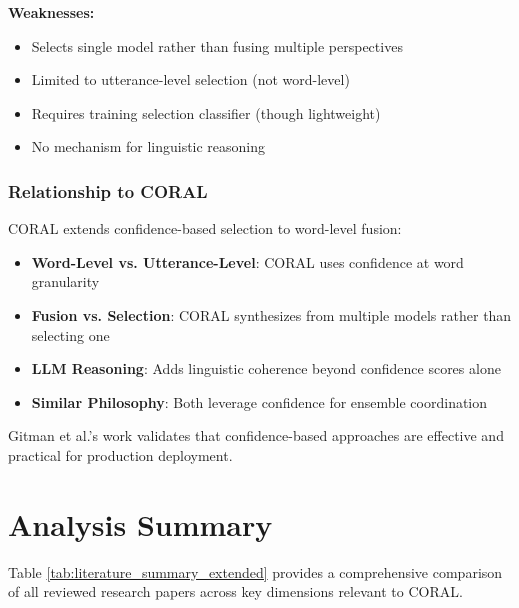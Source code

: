\textbf{Weaknesses:}
\begin{itemize}[topsep=4pt,itemsep=2pt]
    \item Selects single model rather than fusing multiple perspectives
    \item Limited to utterance-level selection (not word-level)
    \item Requires training selection classifier (though lightweight)
    \item No mechanism for linguistic reasoning
\end{itemize}

\subsubsection{Relationship to CORAL}

CORAL extends confidence-based selection to word-level fusion:

\begin{itemize}[topsep=4pt,itemsep=2pt]
    \item \textbf{Word-Level vs. Utterance-Level}: CORAL uses confidence at word granularity
    \item \textbf{Fusion vs. Selection}: CORAL synthesizes from multiple models rather than selecting one
    \item \textbf{LLM Reasoning}: Adds linguistic coherence beyond confidence scores alone
    \item \textbf{Similar Philosophy}: Both leverage confidence for ensemble coordination
\end{itemize}

Gitman et al.'s work validates that confidence-based approaches are effective and practical for production deployment.

\section{Analysis Summary}

Table \ref{tab:literature_summary_extended} provides a comprehensive comparison of all reviewed research papers across key dimensions relevant to CORAL.

